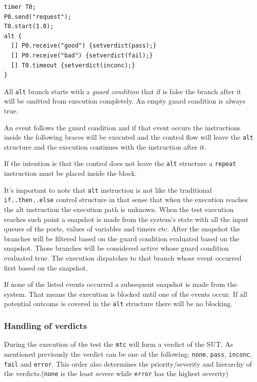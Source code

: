 \documentclass[a4paper]{article}
\begin{document}
{\footnotesize
\begin{lstlisting}
timer T0;
P0.send("request");
T0.start(1.0);
alt {
  [] P0.receive("good") {setverdict(pass);}
  [] P0.receive("bad") {setverdict(fail);}
  [] T0.timeout {setverdict(inconc);}
}
\end{lstlisting}
}

All \verb/alt/ branch starts with a \emph{guard condition} that if is false the branch after it will
be omitted from execution completely. An empty guard condition is always true.

An event follows the guard condition and if that event occurs the instructions inside the following braces will be
executed and the control flow will leave the \verb/alt/ structure and the execution continues with
the
instruction after it.

If the intention is that the control does not leave the \verb/alt/ structure a
\verb/repeat/ instruction must be placed inside the block.

It's important to note that \verb/alt/ instruction is not like the traditional
\verb/if..then..else/ control structure in that sense that when the execution reaches the alt instruction the
execution path is unknown. When the test execution reaches such point a snapshot is made from the system's state with
all the input queues of the ports, values of variables and timers etc. After the snapshot the branches will be filtered
based on the guard condition evaluated based on the snapshot. Those branches will be considered active whose guard
condition evaluated true. The execution dispatches to that branch whose event occurred first based on the snapshot.

If none of the listed events occurred a subsequent snapshot is made from the system. That means the execution is
blocked until one of the events occur. If all potential outcome is covered in the \verb!alt!
structure there will be no blocking.

\subsubsection{Handling of verdicts}

During the execution of the test the \verb!mtc! will form a verdict of the SUT. As mentioned
previously the verdict can be one of the following: \verb/none/, \verb/pass/,
\verb/inconc/, \verb/fail/ and \verb/error/. This order also determines
the priority/severity and hierarchy of the verdicts.(\verb/none/ is the least severe while
\verb/error/ has the highest severity)
\end{document}
